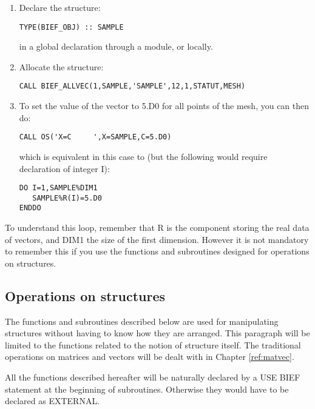 \begin{enumerate}
  \item Declare the structure:

\begin{lstlisting}[language=TelFortran]
TYPE(BIEF_OBJ) :: SAMPLE
\end{lstlisting}
in a global declaration through a module, or locally.

  \item Allocate the structure:

\begin{lstlisting}[language=TelFortran]
CALL BIEF_ALLVEC(1,SAMPLE,'SAMPLE',12,1,STATUT,MESH)
\end{lstlisting}

  \item To set the value of the vector to 5.D0 for all points of the mesh, you
    can then do:

\begin{lstlisting}[language=TelFortran]
CALL OS('X=C     ',X=SAMPLE,C=5.D0)
\end{lstlisting}
which is equivalent in this case to (but the following would require
declaration of integer I):

\begin{lstlisting}[language=TelFortran]
DO I=1,SAMPLE%DIM1
   SAMPLE%R(I)=5.D0
ENDDO
\end{lstlisting}
\end{enumerate}
To understand this loop, remember that R is the component storing the real data
of vectors, and DIM1 the size of the first dimension. However it is not
mandatory to remember this if you use the functions and subroutines designed
for operations on structures.

\subsection{Operations on structures}

The functions and subroutines described below are used for manipulating
structures without having to know how they are arranged. This paragraph will be
limited to the functions related to the notion of structure itself. The
traditional operations on matrices and vectors will be dealt with in Chapter
\ref{ref:matvec}.

All the functions described hereafter will be naturally declared by a USE BIEF
statement at the beginning of subroutines. Otherwise they would have to be
declared as EXTERNAL.

